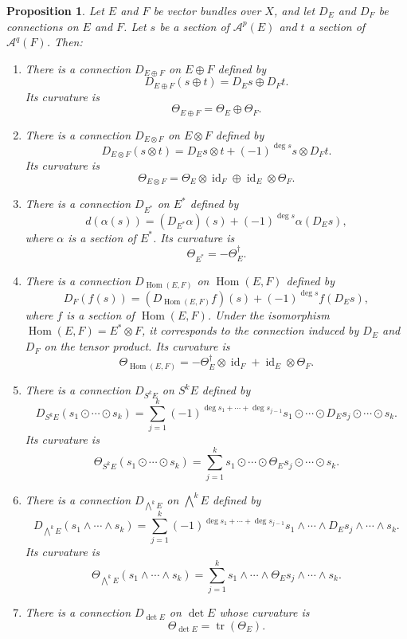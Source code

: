 \documentclass[11pt]{article}
\newtheorem{prop}[theo]{Proposition}
\newcommand{\cc}[1]{\mathcal{#1}}
\DeclareMathOperator{\Hom}{Hom}
\DeclareMathOperator{\id}{id}
\DeclareMathOperator{\tr}{tr}
\begin{document}
\begin{prop}
  Let $E$ and $F$ be vector bundles over $X$, and let $D_E$ and $D_F$ be connections on $E$ and $F$. Let $s$ be a section of $\cc A^p(E)$ and $t$ a section of $\cc A^q(F)$. Then:
  \begin{enumerate}
\item There is a connection $D_{E \oplus F}$ on $E \oplus F$ defined by
\[
D_{E \oplus F}(s \oplus t) = D_E s \oplus D_F t.
\]
Its curvature is
\[
\Theta_{E \oplus F} = \Theta_E \oplus \Theta_F.
\]
\item There is a connection $D_{E \otimes F}$ on $E \otimes F$ defined by
\[
D_{E \otimes F}(s \otimes t)
= D_E s \otimes t + (-1)^{\deg s} s \otimes D_F t.
\]
Its curvature is
\[
\Theta_{E \otimes F} = \Theta_E \otimes \id_F \oplus \id_E \otimes \Theta_F.
\]
\item There is a connection $D_{E^*}$ on $E^*$ defined by
\[
d(\alpha(s))= (D_{E^*}\alpha)(s) + (-1)^{\deg s} \alpha(D_E s),
\]
where $\alpha$ is a section of $E^*$.
Its curvature is
\[
\Theta_{E^*} = -\Theta_E^{\dagger}.
\]
\item There is a connection $D_{\Hom(E,F)}$ on $\Hom(E,F)$ defined by
\[
D_F(f(s)) = (D_{\Hom(E,F)}f)(s) + (-1)^{\deg s} f(D_E s),
\]
where $f$ is a section of $\Hom(E,F)$. Under the isomorphism $\Hom(E,F) = E^* \otimes F$, it corresponds to the connection induced by $D_E$ and $D_F$ on the tensor product. Its curvature is
\[
\Theta_{\Hom(E,F)} = -\Theta_E^{\dagger} \otimes \id_F + \id_E \otimes \Theta_F.
\]
\item There is a connection $D_{S^kE}$ on $S^kE$ defined by
\[
D_{S^kE} (s_1 \odot \cdots \odot s_k)
= \sum_{j=1}^k (-1)^{\deg s_1 + \cdots + \deg s_{j-1}} s_1 \odot \cdots \odot D_E s_j \odot \cdots \odot s_k.
\]
Its curvature is
\[
\Theta_{S^kE} (s_1 \odot \cdots \odot s_k)
= \sum_{j=1}^k s_1 \odot \cdots \odot \Theta_E s_j \odot \cdots \odot s_k.
\]
\item There is a connection $D_{\bigwedge^kE}$ on $\bigwedge^k E$ defined by
\[
D_{\bigwedge^kE} (s_1 \wedge \cdots \wedge s_k)
= \sum_{j=1}^k (-1)^{\deg s_1 + \cdots + \deg s_{j-1}} s_1 \wedge \cdots \wedge D_E s_j \wedge \cdots \wedge s_k.
\]
Its curvature is
\[
\Theta_{\bigwedge^kE} (s_1 \wedge \cdots \wedge s_k)
= \sum_{j=1}^k s_1 \wedge \cdots \wedge \Theta_E s_j \wedge \cdots \wedge s_k.
\]
\item There is a connection $D_{\det E}$ on $\det E$ whose curvature is
\[
\Theta_{\det E}
= \tr(\Theta_E).
\]
\end{enumerate}
\end{prop}
\end{document}
